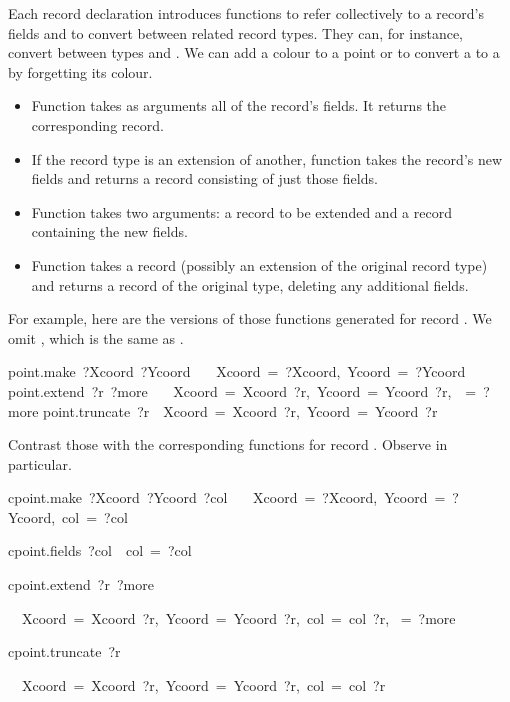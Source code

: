 Each record declaration introduces functions to refer collectively to a
record's fields and to convert between related record types.  They can, for
instance, convert between types  and .  We can add a
colour to a point or to convert a  to a  by forgetting
its colour.

\begin{itemize}
\item Function  takes as arguments all of the record's fields.
  It returns the corresponding record. 
\item If the record type is an extension of another, 
      function  takes the record's new fields
      and returns a record consisting of just those fields.  
\item Function  takes two arguments: a record to be extended and a
  record containing the new fields.
\item Function  takes a record (possibly an extension of the
  original record type) and returns a record of the original type, deleting
  any additional fields.
\end{itemize}

For example, here are the versions of those functions generated for record
.  We omit , which is the same as 
.
\begin{isabelle}
point.make\ ?Xcoord\ ?Ycoord\ \isasymequiv \isanewline\smallskip
\ \ \isasymlparr Xcoord\ =\ ?Xcoord,\ Ycoord\ =\ ?Ycoord\isasymrparr \isanewline
point.extend\ ?r\ ?more\ \isasymequiv \isanewline\smallskip
\ \ \isasymlparr Xcoord\ =\ Xcoord\ ?r,\ Ycoord\ =\ Ycoord\ ?r,\ \isasymdots \ =\ ?more\isasymrparr \isanewline\smallskip
point.truncate\ ?r\ \isasymequiv \ \isasymlparr Xcoord\ =\ Xcoord\ ?r,\ Ycoord\ =\ Ycoord\ ?r\isasymrparr 
\end{isabelle}

Contrast those with the corresponding functions for record .
Observe  in particular.
\begin{isabelle}
cpoint.make\ ?Xcoord\ ?Ycoord\ ?col\ \isasymequiv \isanewline
\ \ \isasymlparr Xcoord\ =\ ?Xcoord,\ Ycoord\ =\ ?Ycoord,\ col\ =\ ?col\isasymrparr \par\smallskip
cpoint.fields\ ?col\ \isasymequiv \ \isasymlparr col\ =\ ?col\isasymrparr \par\smallskip
cpoint.extend\ ?r\ ?more\ \isasymequiv \par
\ \ \isasymlparr Xcoord\ =\ Xcoord\ ?r,\ Ycoord\ =\ Ycoord\ ?r,\ col\ =\ col\ ?r,\isanewline
\isaindent{\ \ \ }\isasymdots \ =\ ?more\isasymrparr \par\smallskip
cpoint.truncate\ ?r\ \isasymequiv \par
\ \ \isasymlparr Xcoord\ =\ Xcoord\ ?r,\ Ycoord\ =\ Ycoord\ ?r,\ col\ =\ col\ ?r\isasymrparr 
\end{isabelle}

